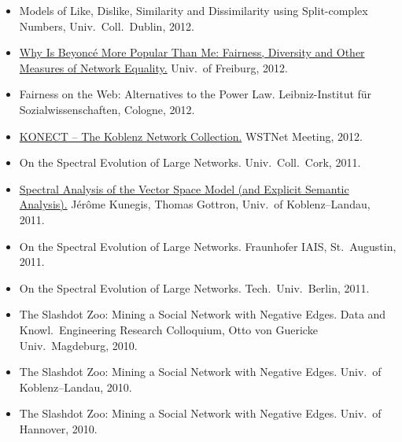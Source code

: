 \documentclass[line,mm]{res}
\newcounter{x}
\newcounter{y}
\newcommand{\talknumber}{T\arabic{y}\stepcounter{y}}
\begin{document}
\begin{resume}
\begin{itemize}
  \item[{[\talknumber]}] Models of Like, Dislike, Similarity and Dissimilarity using
    Split-complex Numbers, Univ.\ Coll.\ Dublin, 2012. 
  \item[{[\talknumber]}] 
    \href{https://www.slideshare.net/kunegis/why-beyonc-is-more-popular-than-me-fairness-diversity-and-other-measures}{Why Is Beyoncé More Popular Than Me:  Fairness, Diversity and
    Other Measures of Network Equality.} Univ.\ of Freiburg, 2012. 
  \item[{[\talknumber]}] Fairness on the Web: Alternatives to the Power
    Law. 
    Leibniz-Institut für Sozialwissenschaften, Cologne, 2012.  
  \item[{[\talknumber]}] 
    \href{https://github.com/kunegis/pdfs/blob/master/kunegis:network-survey.presentation.pdf}{KONECT
      -- The Koblenz Network Collection.}  WSTNet Meeting, 2012.  
  \item[{[\talknumber]}] On the Spectral Evolution of Large Networks.  Univ.\ Coll.\ Cork, 2011.   
  \item[{[\talknumber]}] 
    \href{https://github.com/kunegis/pdfs/blob/master/kunegis:explicit-diagonality.presentation.pdf}{Spectral
      Analysis of the Vector Space Model (and Explicit Semantic Analysis).}
    Jérôme Kunegis, Thomas Gottron, Univ.\ of Koblenz--Landau, 2011. 
  \item[{[\talknumber]}] On the Spectral Evolution of Large Networks.  Fraunhofer IAIS,
    St.\ Augustin, 2011.  
  \item[{[\talknumber]}] On the Spectral Evolution of Large Networks. Tech.\ Univ.\ Berlin, 2011.  
  \item[{[\talknumber]}] The Slashdot Zoo: Mining a Social Network with Negative
    Edges. Data and Knowl.\ Engineering Research Colloquium,
    Otto von Guericke Univ.\ Magdeburg, 2010.  
  \item[{[\talknumber]}] The Slashdot Zoo: Mining a Social Network with Negative
    Edges. Univ.\ of Koblenz--Landau, 2010. 
  \item[{[\talknumber]}] The Slashdot Zoo: Mining a Social Network with Negative
    Edges. Univ.\ of Hannover, 2010. 

\end{itemize}
\end{resume}
\end{document}
